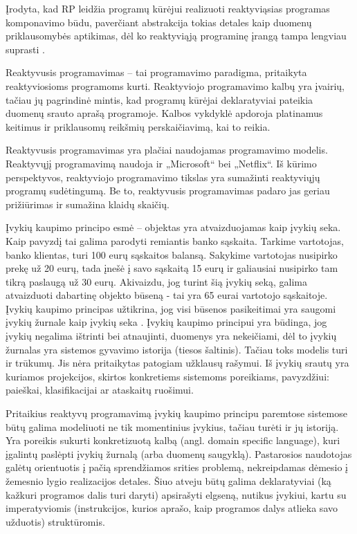 Įrodyta, kad RP leidžia programų kūrėjui realizuoti reaktyviąsias programas komponavimo būdu, paverčiant abstrakcija tokias detales kaip duomenų priklausomybės aptikimas, dėl ko reaktyviąją programinę įrangą tampa lengviau suprasti \cite{Cooper:2006:EDD:2182132.2182152, Meyerovich:2009:FPL:1639949.1640091, Salvaneschi:2014:RBO:2577080.2577083}.

Reaktyvusis programavimas – tai programavimo paradigma, pritaikyta reaktyviosioms programoms kurti. Reaktyviojo programavimo kalbų yra įvairių, tačiau jų pagrindinė mintis, kad programų kūrėjai deklaratyviai pateikia duomenų srauto aprašą programoje. Kalbos vykdyklė apdoroja platinamus keitimus ir priklausomų reikšmių perskaičiavimą, kai to reikia.

Reaktyvusis programavimas yra plačiai naudojamas programavimo modelis. Reaktyvųjį programavimą naudoja ir „Microsoft“ bei „Netflix“. Iš kūrimo perspektyvos, reaktyviojo programavimo tikslas yra sumažinti reaktyviųjų programų sudėtingumą. Be to, reaktyvusis programavimas padaro jas geriau prižiūrimas ir sumažina klaidų skaičių.

Įvykių kaupimo principo esmė – objektas yra atvaizduojamas kaip įvykių seka. Kaip pavyzdį tai galima parodyti remiantis banko sąskaita. Tarkime vartotojas, banko klientas, turi 100 eurų sąskaitos balansą. Sakykime vartotojas nusipirko prekę už 20 eurų, tada įnešė į savo sąskaitą 15 eurų ir galiausiai nusipirko tam tikrą paslaugą už 30 eurų. Akivaizdu, jog turint šią įvykių seką, galima atvaizduoti dabartinę objekto būseną - tai yra 65 eurai vartotojo sąskaitoje. Įvykių kaupimo principas užtikrina, jog visi būsenos pasikeitimai yra saugomi įvykių žurnale kaip įvykių seka \cite{vernon2013implementing}. Įvykių kaupimo principui yra būdinga, jog įvykių negalima ištrinti bei atnaujinti, duomenys yra nekeičiami, dėl to įvykių žurnalas yra sistemos gyvavimo istorija (tiesos šaltinis). Tačiau toks modelis turi ir trūkumų. Jis nėra pritaikytas patogiam užklausų rašymui. Iš įvykių srautų yra kuriamos projekcijos, skirtos konkretiems sistemoms poreikiams, pavyzdžiui: paieškai, klasifikacijai ar ataskaitų ruošimui.

Pritaikius reaktyvų programavimą įvykių kaupimo principu paremtose sistemose būtų galima modeliuoti ne tik momentinius įvykius, tačiau turėti ir jų istoriją. Yra poreikis sukurti konkretizuotą kalbą (angl. domain specific language), kuri įgalintų paslėpti įvykių žurnalą (arba duomenų saugyklą). Pastarosios naudotojas galėtų orientuotis į pačią sprendžiamos srities problemą, nekreipdamas dėmesio į žemesnio lygio realizacijos detales. Šiuo atveju būtų galima deklaratyviai (ką kažkuri programos dalis turi daryti) apsirašyti elgseną, nutikus įvykiui, kartu su imperatyviomis (instrukcijos, kurios aprašo, kaip programos dalys atlieka savo užduotis) struktūromis.

